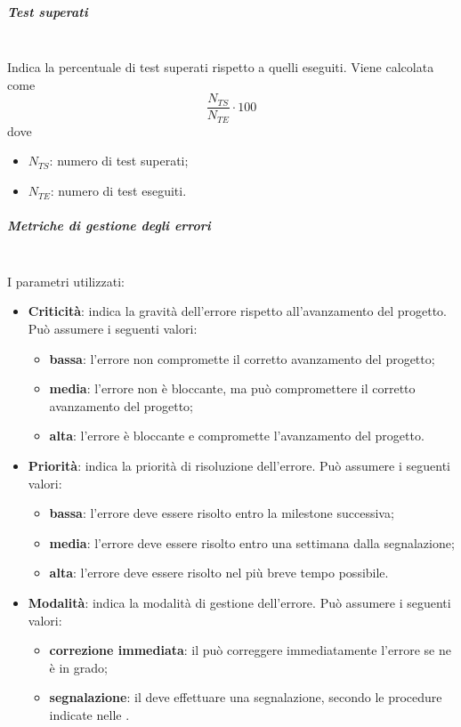 \subparagraph{Test superati}\mbox{}\\
Indica la percentuale di test superati rispetto a quelli eseguiti. Viene calcolata come
\[ \frac{N_{TS}}{N_{TE}} \cdot 100 \]
dove
\begin{itemize}
	\item $N_{TS}$: numero di test superati;
	\item $N_{TE}$: numero di test eseguiti.
\end{itemize}

\subparagraph{Metriche di gestione degli errori}\mbox{}\\
I parametri utilizzati:
\begin{itemize}
	\item \textbf{Criticità}: indica la gravità dell'errore rispetto all'avanzamento del progetto. Può assumere i seguenti valori:
	\begin{itemize}
		\item \textbf{bassa}: l'errore non compromette il corretto avanzamento del progetto;
		\item \textbf{media}: l'errore non è bloccante, ma può compromettere il corretto avanzamento del progetto;
		\item \textbf{alta}: l'errore è bloccante e compromette l'avanzamento del progetto.	
	\end{itemize}
	\item \textbf{Priorità}: indica la priorità di risoluzione dell'errore. Può assumere i seguenti valori:
	\begin{itemize}
		\item \textbf{bassa}: l'errore deve essere risolto entro la milestone successiva;
		\item \textbf{media}: l'errore deve essere risolto entro una settimana dalla segnalazione;
		\item \textbf{alta}: l'errore deve essere risolto nel più breve tempo possibile.
	\end{itemize}
	\item \textbf{Modalità}: indica la modalità di gestione dell'errore. Può assumere i seguenti valori:
	\begin{itemize}
		\item \textbf{correzione immediata}: il \Verificatore{} può correggere immediatamente l'errore se ne è in grado;
		\item \textbf{segnalazione}: il \Verificatore{} deve effettuare una segnalazione, secondo le procedure indicate nelle \NormeDiProgetto{}.
	\end{itemize}
\end{itemize}

